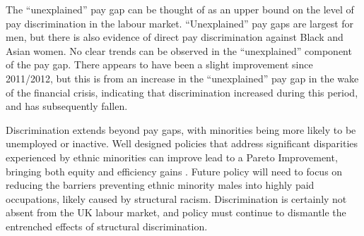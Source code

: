 \documentclass[class=article, crop=false]{standalone}
\begin{document}
The \enquote{unexplained} pay gap can be thought of as an upper bound on the level of pay discrimination in the labour market. \enquote{Unexplained} pay gaps are largest for men, but there is also evidence of direct pay discrimination against Black and Asian women. No clear trends can be observed in the \enquote{unexplained} component of the pay gap. There appears to have been a slight improvement since 2011/2012, but this is from an increase in the \enquote{unexplained} pay gap in the wake of the financial crisis, indicating that discrimination increased during this period, and has subsequently fallen.

Discrimination extends beyond pay gaps, with minorities being more likely to be unemployed or inactive. Well designed policies that address significant disparities experienced by ethnic minorities can improve lead to a Pareto Improvement, bringing both equity and efficiency gains \citep{LundbergB}. Future policy will need to focus on reducing the barriers preventing ethnic minority males into highly paid occupations, likely caused by structural racism. Discrimination is certainly not absent from the UK labour market, and policy must continue to dismantle the entrenched effects of structural discrimination. %

\ifstandalone

\fi
\end{document}
